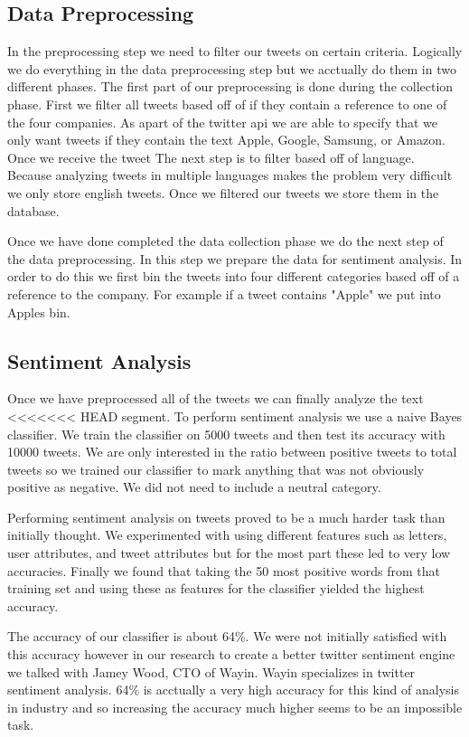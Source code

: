\documentclass{acm_proc_article-sp}
\begin{document}
\subsection{Data Preprocessing}

In the preprocessing step we need to filter our tweets on certain criteria.
Logically we do everything in the data preprocessing step but we acctually do
them in two different phases. The first part of our preprocessing is done
during the collection phase. First we filter all tweets based off of if they
contain a reference to one of the four companies. As apart of the twitter api
we are able to specify that we only want tweets if they contain the text Apple,
Google, Samsung, or Amazon. Once we receive the tweet The next step is to
filter based off of language. Because analyzing tweets in multiple languages
makes the problem very difficult we only store english tweets. Once we filtered
our tweets we store them in the database.

Once we have done completed the data collection phase we do the next step of
the data preprocessing. In this step we prepare the data for sentiment
analysis. In order to do this we first bin the tweets into four different
categories based off of a reference to the company. For example if a tweet
contains "Apple" we put into Apples bin.  

\subsection{Sentiment Analysis}

Once we have preprocessed all of the tweets we can finally analyze the text
<<<<<<< HEAD
segment. To perform sentiment analysis we use a naive Bayes classifier. We
train the classifier on 5000 tweets and then test its accuracy with 10000
tweets.  We are only interested in the ratio between positive tweets to total
tweets so we trained our classifier to mark anything that was not obviously
positive as negative. We did not need to include a neutral category. 

Performing sentiment analysis on tweets proved to be a much harder task than
initially thought. We experimented with using different features such as
letters, user attributes, and tweet attributes but for the most part these led
to very low accuracies. Finally we found that taking the 50 most positive words
from that training set and using these as features for the classifier yielded
the highest accuracy. 

The accuracy of our classifier is about 64\%. We were
not initially satisfied with this accuracy however in our research to create a
better twitter sentiment engine we talked with Jamey Wood, CTO of Wayin. Wayin
specializes in twitter sentiment analysis. 64\% is acctually a very high
accuracy for this kind of analysis in industry and so increasing the accuracy
much higher seems to be an impossible task.
 
\end{document}
